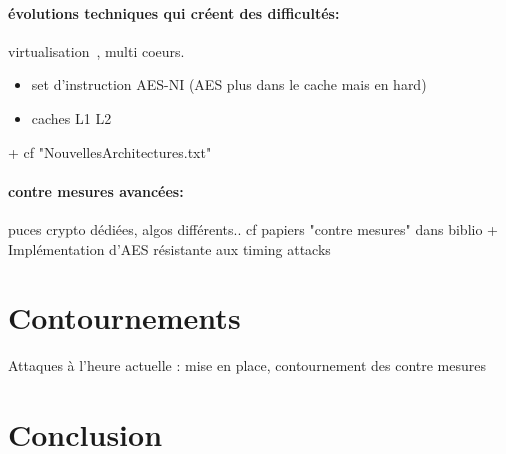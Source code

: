 \documentclass[a4paper,11pt]{article}
\begin{document}
\paragraph{évolutions techniques qui créent des difficultés:} virtualisation~\cite{weiss2012cache}, multi coeurs.  %
\begin{itemize}
\item set d'instruction AES-NI (AES plus dans le cache mais en hard)
\item caches L1 L2
\end{itemize}
+ cf "NouvellesArchitectures.txt"

\paragraph{contre mesures avancées:}  puces crypto dédiées, algos différents.. cf papiers "contre mesures" dans biblio + Implémentation d'AES résistante aux timing attacks~\cite{kasper2009faster} %

\section{Contournements}
Attaques à l'heure actuelle : mise en place, contournement des contre mesures %

\section*{Conclusion}

\newpage
\nocite{*}


\end{document}
